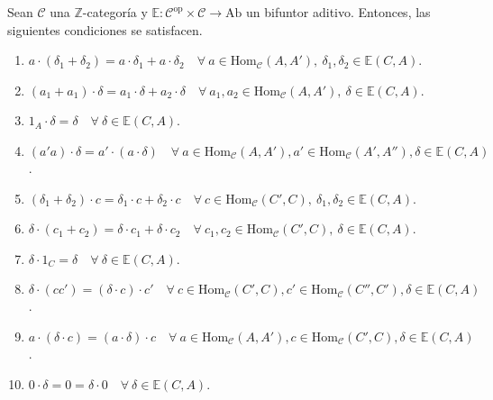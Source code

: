 \documentclass[tesis]{subfiles}
\begin{document}
\begin{Prop}\label{Prop: Bimódulo generalizado inducido por un bifuntor aditivo}
    Sean $\mathscr{C}$ una $\mathbb{Z}$-categoría y $\mathbb{E}:\mathscr{C}^\text{op}\times\mathscr{C}\to \text{Ab}$ un bifuntor aditivo. Entonces, las siguientes condiciones se satisfacen.
    
    \begin{enumerate}[label=(\alph*)]

        \item $a\cdot(\delta_1+\delta_2) = a\cdot\delta_1 + a\cdot\delta_2 \quad \forall \ a\in\text{Hom}_\mathscr{C}(A,A'), \ \delta_1,\delta_2\in\mathbb{E}(C,A)$.
    
        \item $(a_1+a_1)\cdot\delta = a_1\cdot\delta + a_2\cdot\delta \quad \forall \ a_1,a_2\in\text{Hom}_\mathscr{C}(A,A'), \ \delta\in\mathbb{E}(C,A)$.

        \item $1_A\cdot\delta = \delta \quad \forall \ \delta\in\mathbb{E}(C,A)$.

        \item $(a'a)\cdot\delta = a'\cdot(a\cdot\delta) \quad \forall \ a\in\text{Hom}_\mathscr{C}(A,A'), a'\in\text{Hom}_\mathscr{C}(A',A''), \delta\in\mathbb{E}(C,A)$.

        \item $(\delta_1+\delta_2)\cdot c = \delta_1\cdot c + \delta_2\cdot c \quad \forall \ c\in\text{Hom}_\mathscr{C}(C',C), \ \delta_1,\delta_2\in\mathbb{E}(C,A)$.

        \item $\delta\cdot(c_1+c_2)=\delta\cdot c_1 + \delta\cdot c_2 \quad \forall \ c_1,c_2\in\text{Hom}_\mathscr{C}(C',C), \ \delta\in\mathbb{E}(C,A)$.

        \item $\delta\cdot1_C  = \delta\quad \forall \ \delta\in\mathbb{E}(C,A)$.

        \item $\delta\cdot(cc') = (\delta\cdot c)\cdot c' \quad \forall \ c\in\text{Hom}_\mathscr{C}(C',C), c'\in\text{Hom}_\mathscr{C}(C'',C'), \delta\in\mathbb{E}(C,A)$.

        \item $a\cdot(\delta\cdot c) = (a\cdot\delta)\cdot c \quad \forall \ a\in\text{Hom}_\mathscr{C}(A,A'), c\in\text{Hom}_\mathscr{C}(C',C), \delta\in\mathbb{E}(C,A)$.

        \item $0\cdot\delta = 0 = \delta\cdot0 \quad \forall \ \delta\in\mathbb{E}(C,A)$.
    \end{enumerate}
\end{Prop}
\end{document}
